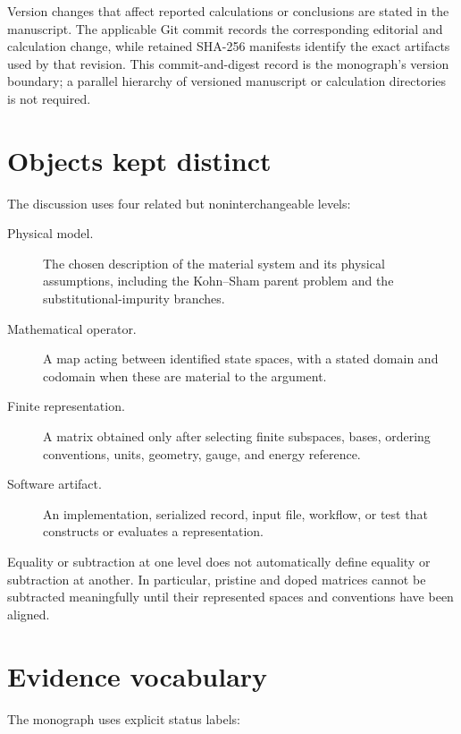 Version changes that affect reported calculations or conclusions are stated in
the manuscript. The applicable Git commit records the corresponding editorial
and calculation change, while retained SHA-256 manifests identify the exact
artifacts used by that revision. This commit-and-digest record is the monograph's
version boundary; a parallel hierarchy of versioned manuscript or calculation
directories is not required.

\section*{Objects kept distinct}

The discussion uses four related but noninterchangeable levels:

\begin{description}
  \item[Physical model.] The chosen description of the material system and its
    physical assumptions, including the Kohn--Sham parent problem and the
    substitutional-impurity branches.
  \item[Mathematical operator.] A map acting between identified state spaces,
    with a stated domain and codomain when these are material to the argument.
  \item[Finite representation.] A matrix obtained only after selecting finite
    subspaces, bases, ordering conventions, units, geometry, gauge, and energy
    reference.
  \item[Software artifact.] An implementation, serialized record, input file,
    workflow, or test that constructs or evaluates a representation.
\end{description}

Equality or subtraction at one level does not automatically define equality or
subtraction at another. In particular, pristine and doped matrices cannot be
subtracted meaningfully until their represented spaces and conventions have
been aligned.

\section*{Evidence vocabulary}


The monograph uses explicit status labels:

